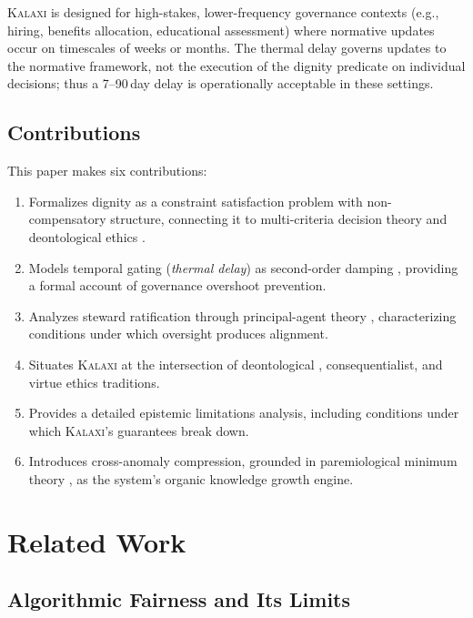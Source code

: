\documentclass[12pt,a4paper]{article}
\theoremstyle{definition}
\theoremstyle{remark}
\newcommand{\kalaxi}{\textsc{Kalaxi}}
\begin{document}
\noindent \kalaxi{} is designed for high-stakes, lower-frequency governance contexts
(e.g., hiring, benefits allocation, educational assessment) where normative updates
occur on timescales of weeks or months. The thermal delay governs updates to the
normative framework, not the execution of the dignity predicate on individual
decisions; thus a 7–90 day delay is operationally acceptable in these settings.

\subsection*{Contributions}

This paper makes six contributions:

\begin{enumerate}[leftmargin=*,label=\textbf{C\arabic*.}]
\item Formalizes dignity as a constraint satisfaction problem with non-compensatory
  structure, connecting it to multi-criteria decision theory \cite{belton2002} and
  deontological ethics \cite{kant1785}.
\item Models temporal gating (\emph{thermal delay}) as second-order damping
  \cite{astrom2021}, providing a formal account of governance overshoot prevention.
\item Analyzes steward ratification through principal-agent theory \cite{holmstrom1979},
  characterizing conditions under which oversight produces alignment.
\item Situates \kalaxi{} at the intersection of deontological \cite{kant1785},
  consequentialist, and virtue ethics \cite{macintyre2007} traditions.
\item Provides a detailed epistemic limitations analysis, including conditions under
  which \kalaxi{}'s guarantees break down.
\item Introduces cross-anomaly compression, grounded in paremiological minimum theory
  \cite{lauhakangas2014}, as the system's organic knowledge growth engine.
\end{enumerate}

\section{Related Work}
\label{sec:related}

\subsection{Algorithmic Fairness and Its Limits}
\end{document}
